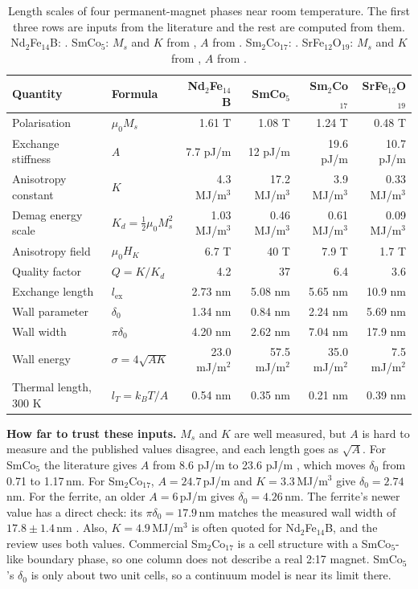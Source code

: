 \documentclass[10pt,a4paper]{article}
\newcommand{\mo}{\mu_0}
\begin{document}
\begin{table}[h]
\centering\small
\caption{Length scales of four permanent-magnet phases near room temperature. The first three rows are inputs from the
literature and the rest are computed from them. Nd$_2$Fe$_{14}$B: \cite{fischbacher2018}. SmCo$_5$: $M_s$ and $K$ from
\cite{coey2011}, $A$ from \cite{kurichenko}. Sm$_2$Co$_{17}$: \cite{yang2023}. SrFe$_{12}$O$_{19}$: $M_s$ and $K$ from
\cite{coey2011}, $A$ from \cite{murakami}.}
\label{tab:magnets}
\begin{tabular}{@{}l l r r r r@{}}
\toprule
Quantity & Formula & Nd$_2$Fe$_{14}$B & SmCo$_5$ & Sm$_2$Co$_{17}$ & SrFe$_{12}$O$_{19}$ \\
\midrule
Polarisation & $\mo M_s$ & 1.61 T & 1.08 T & 1.24 T & 0.48 T \\
Exchange stiffness & $A$ & 7.7 pJ/m & 12 pJ/m & 19.6 pJ/m & 10.7 pJ/m \\
Anisotropy constant & $K$ & 4.3 MJ/m$^3$ & 17.2 MJ/m$^3$ & 3.9 MJ/m$^3$ & 0.33 MJ/m$^3$ \\
\midrule
Demag energy scale & $K_d = \frac12\mo M_s^2$ & 1.03 MJ/m$^3$ & 0.46 MJ/m$^3$ & 0.61 MJ/m$^3$ & 0.09 MJ/m$^3$ \\
Anisotropy field & $\mo H_K$ & 6.7 T & 40 T & 7.9 T & 1.7 T \\
Quality factor & $Q = K/K_d$ & 4.2 & 37 & 6.4 & 3.6 \\
Exchange length & $l_\mathrm{ex}$ & 2.73 nm & 5.08 nm & 5.65 nm & 10.9 nm \\
Wall parameter & $\delta_0$ & 1.34 nm & 0.84 nm & 2.24 nm & 5.69 nm \\
Wall width & $\pi\delta_0$ & 4.20 nm & 2.62 nm & 7.04 nm & 17.9 nm \\
Wall energy & $\sigma = 4\sqrt{AK}$ & 23.0 mJ/m$^2$ & 57.5 mJ/m$^2$ & 35.0 mJ/m$^2$ & 7.5 mJ/m$^2$ \\
Thermal length, 300 K & $l_T = k_BT/A$ & 0.54 nm & 0.35 nm & 0.21 nm & 0.39 nm \\
\bottomrule
\end{tabular}
\end{table}

\textbf{How far to trust these inputs.} $M_s$ and $K$ are well measured, but $A$ is hard to measure and the published values
disagree, and each length goes as $\sqrt{A}$. For SmCo$_5$ the literature gives $A$ from 8.6 pJ/m \cite{yang2023} to 23.6 pJ/m
\cite{pierobon}, which moves $\delta_0$ from 0.71 to 1.17\,nm. For Sm$_2$Co$_{17}$, $A = 24.7$\,pJ/m and $K = 3.3$\,MJ/m$^3$
\cite{pierobon} give $\delta_0 = 2.74$\,nm. For the ferrite, an older $A = 6$\,pJ/m \cite{sfofilm} gives $\delta_0 = 4.26$\,nm.
The ferrite's newer value has a direct check: its $\pi\delta_0 = 17.9$\,nm matches the measured wall width of
$17.8\pm1.4$\,nm \cite{murakami}. Also, $K = 4.9$\,MJ/m$^3$ is often quoted for Nd$_2$Fe$_{14}$B, and the review uses both
values. Commercial Sm$_2$Co$_{17}$ is a cell structure with a SmCo$_5$-like boundary phase, so one column does not describe a
real 2:17 magnet. SmCo$_5$'s $\delta_0$ is only about two unit cells, so a continuum model is near its limit there.
\end{document}
